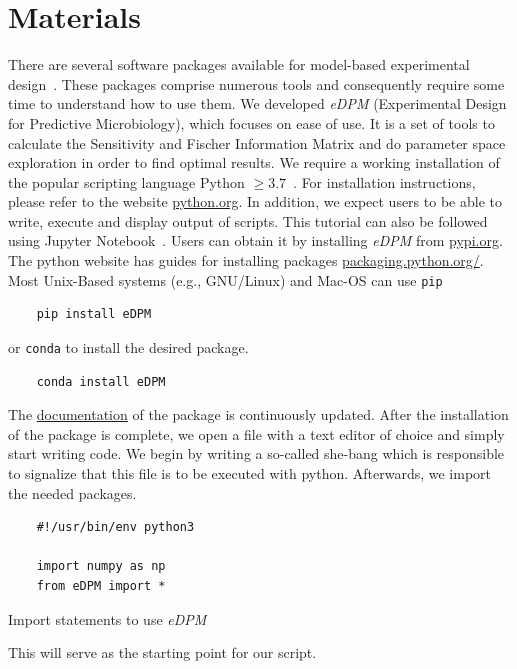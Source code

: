 \documentclass[graybox]{svmult}
\begin{document}
\section{Materials}
There are several software packages available for model-based experimental design~\cite{balsa-canto_amigo2_2016, zhang_optimal_2018, busetto_near-optimal_2013}.
These packages comprise numerous tools and consequently require some time to understand how to use them.
We developed {\it eDPM} (Experimental Design for Predictive Microbiology), which focuses on ease of use.
It is a set of tools to calculate the Sensitivity and Fischer Information Matrix and do parameter space exploration in order to find optimal results.
We require a working installation of the popular scripting language Python $\geq3.7$~\cite{rossumPythonLanguageReference2010}.
For installation instructions, please refer to the website \href{https://www.python.org/downloads/}{python.org}.
In addition, we expect users to be able to write, execute and display output of scripts.
This tutorial can also be followed using Jupyter Notebook~\cite{jupyterteamJupyterNotebook}.
%
Users can obtain it by installing {\it eDPM} from \href{https://pypi.org/project/edpm/0.0.1/}{pypi.org}.
The python website has guides for installing packages \href{https://packaging.python.org/en/latest/tutorials/installing-packages/}{packaging.python.org/}.
Most Unix-Based systems (e.g., GNU/Linux) and Mac-OS can use \texttt{pip}
\begin{verbatim}
    pip install eDPM
\end{verbatim}
or \texttt{conda} to install the desired package.
\begin{verbatim}
    conda install eDPM
\end{verbatim}
The \href{https://spatial-systems-biology-freiburg.github.io/eDPM/}{documentation} of the package is continuously updated.
After the installation of the package is complete, we open a file with a text editor of choice and simply start writing code.
We begin by writing a so-called she-bang which is responsible to signalize that this file is to be executed with python.
Afterwards, we import the needed packages.
\begin{code}[h]
    \begin{verbatim}
    #!/usr/bin/env python3

    import numpy as np
    from eDPM import *
    \end{verbatim}
    \caption{Import statements to use {\it eDPM}}
    \label{code:import_statements}
\end{code}
This will serve as the starting point for our script.
\end{document}
